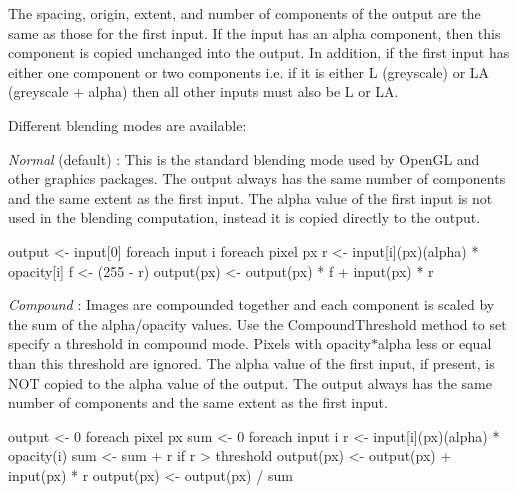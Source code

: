The spacing, origin, extent, and number of components of the output are the same as those for the first input. If the input has an alpha component, then this component is copied unchanged into the output. In addition, if the first input has either one component or two components i.\-e. if it is either L (greyscale) or L\-A (greyscale + alpha) then all other inputs must also be L or L\-A.

Different blending modes are available\-:

{\itshape Normal} (default) \-: This is the standard blending mode used by Open\-G\-L and other graphics packages. The output always has the same number of components and the same extent as the first input. The alpha value of the first input is not used in the blending computation, instead it is copied directly to the output.

\begin{DoxyVerb} output <- input[0]
 foreach input i {
   foreach pixel px {
     r <- input[i](px)(alpha) * opacity[i]
     f <- (255 - r)
     output(px) <- output(px) * f + input(px) * r
   }
 }\end{DoxyVerb}


{\itshape Compound} \-: Images are compounded together and each component is scaled by the sum of the alpha/opacity values. Use the Compound\-Threshold method to set specify a threshold in compound mode. Pixels with opacity$\ast$alpha less or equal than this threshold are ignored. The alpha value of the first input, if present, is N\-O\-T copied to the alpha value of the output. The output always has the same number of components and the same extent as the first input.

\begin{DoxyVerb} output <- 0
 foreach pixel px {
   sum <- 0
   foreach input i {
     r <- input[i](px)(alpha) * opacity(i)
     sum <- sum + r
     if r > threshold {
       output(px) <- output(px) + input(px) * r
     }
   }
   output(px) <- output(px) / sum
 }\end{DoxyVerb}


